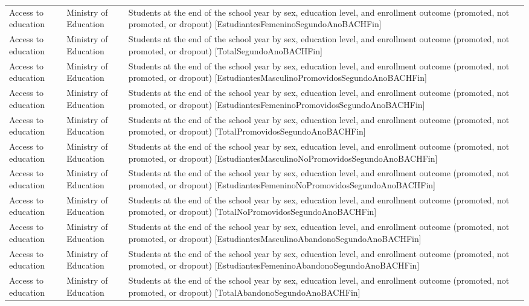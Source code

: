 \documentclass[10pt,a4paper]{article}
\begin{document}
\begin{longtable}{@{}>{\raggedright\arraybackslash}p{3.5cm}>{\raggedright\arraybackslash}p{5.6cm}>{\raggedright\arraybackslash}p{\dimexpr\textwidth-9.1cm-4\tabcolsep\relax}@{}}
Access to education & Ministry of Education & Students at the end of the school year by sex, education level, and enrollment outcome (promoted, not promoted, or dropout) [EstudiantesFemeninoSegundoAnoBACHFin]\\
Access to education & Ministry of Education & Students at the end of the school year by sex, education level, and enrollment outcome (promoted, not promoted, or dropout) [TotalSegundoAnoBACHFin]\\
Access to education & Ministry of Education & Students at the end of the school year by sex, education level, and enrollment outcome (promoted, not promoted, or dropout) [EstudiantesMasculinoPromovidosSegundoAnoBACHFin]\\
Access to education & Ministry of Education & Students at the end of the school year by sex, education level, and enrollment outcome (promoted, not promoted, or dropout) [EstudiantesFemeninoPromovidosSegundoAnoBACHFin]\\
Access to education & Ministry of Education & Students at the end of the school year by sex, education level, and enrollment outcome (promoted, not promoted, or dropout) [TotalPromovidosSegundoAnoBACHFin]\\
Access to education & Ministry of Education & Students at the end of the school year by sex, education level, and enrollment outcome (promoted, not promoted, or dropout) [EstudiantesMasculinoNoPromovidosSegundoAnoBACHFin]\\
Access to education & Ministry of Education & Students at the end of the school year by sex, education level, and enrollment outcome (promoted, not promoted, or dropout) [EstudiantesFemeninoNoPromovidosSegundoAnoBACHFin]\\
Access to education & Ministry of Education & Students at the end of the school year by sex, education level, and enrollment outcome (promoted, not promoted, or dropout) [TotalNoPromovidosSegundoAnoBACHFin]\\
Access to education & Ministry of Education & Students at the end of the school year by sex, education level, and enrollment outcome (promoted, not promoted, or dropout) [EstudiantesMasculinoAbandonoSegundoAnoBACHFin]\\
Access to education & Ministry of Education & Students at the end of the school year by sex, education level, and enrollment outcome (promoted, not promoted, or dropout) [EstudiantesFemeninoAbandonoSegundoAnoBACHFin]\\
Access to education & Ministry of Education & Students at the end of the school year by sex, education level, and enrollment outcome (promoted, not promoted, or dropout) [TotalAbandonoSegundoAnoBACHFin]\\

\end{longtable}
\end{document}
